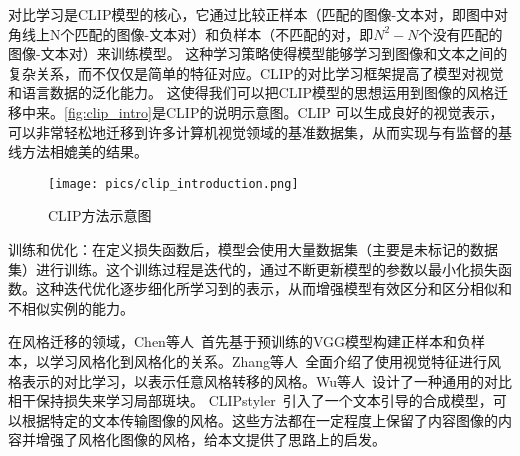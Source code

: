 对比学习是CLIP模型的核心，它通过比较正样本（匹配的图像-文本对，即图中对角线上N个匹配的图像-文本对）和负样本（不匹配的对，即$N^2-N$个没有匹配的图像-文本对）来训练模型。
这种学习策略使得模型能够学习到图像和文本之间的复杂关系，而不仅仅是简单的特征对应。CLIP的对比学习框架提高了模型对视觉和语言数据的泛化能力。
这使得我们可以把CLIP模型的思想运用到图像的风格迁移中来。\autoref{fig:clip_intro}是CLIP的说明示意图。CLIP 可以生成良好的视觉表示，
可以非常轻松地迁移到许多计算机视觉领域的基准数据集，从而实现与有监督的基线方法相媲美的结果。
\begin{figure}[htbp]
    \centering
    \texttt{[image: pics/clip\_introduction.png]}
    \caption{\label{fig:clip_intro}CLIP方法示意图}
\end{figure}
\par 训练和优化：在定义损失函数后，模型会使用大量数据集（主要是未标记的数据集）进行训练。这个训练过程是迭代的，通过不断更新模型的参数以最小化损失函数。这种迭代优化逐步细化所学习到的表示，从而增强模型有效区分和区分相似和不相似实例的能力。
\par 在风格迁移的领域，Chen等人~\cite{chen2021artistic}首先基于预训练的VGG模型构建正样本和负样本，以学习风格化到风格化的关系。Zhang等人~\cite{zhang2022domain}全面介绍了使用视觉特征进行风格表示的对比学习，以表示任意风格转移的风格。Wu等人~\cite{wu2022ccpl}设计了一种通用的对比相干保持损失来学习局部斑块。
CLIPstyler~\cite{kwon2022clipstyler}引入了一个文本引导的合成模型，可以根据特定的文本传输图像的风格。这些方法都在一定程度上保留了内容图像的内容并增强了风格化图像的风格，给本文提供了思路上的启发。

